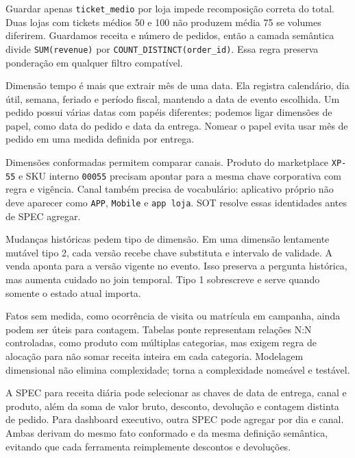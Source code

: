Guardar apenas \texttt{ticket\_medio} por loja impede recomposição correta do total. Duas lojas com tickets médios 50 e 100 não produzem média 75 se volumes diferirem. Guardamos receita e número de pedidos, então a camada semântica divide \texttt{SUM(revenue)} por \texttt{COUNT\_DISTINCT(order\_id)}. Essa regra preserva ponderação em qualquer filtro compatível.

Dimensão tempo é mais que extrair mês de uma data. Ela registra calendário, dia útil, semana, feriado e período fiscal, mantendo a data de evento escolhida. Um pedido possui várias datas com papéis diferentes; podemos ligar dimensões de papel, como data do pedido e data da entrega. Nomear o papel evita usar mês de pedido em uma medida definida por entrega.

Dimensões conformadas permitem comparar canais. Produto do marketplace \texttt{XP-55} e SKU interno \texttt{00055} precisam apontar para a mesma chave corporativa com regra e vigência. Canal também precisa de vocabulário: aplicativo próprio não deve aparecer como \texttt{APP}, \texttt{Mobile} e \texttt{app loja}. SOT resolve essas identidades antes de SPEC agregar.

Mudanças históricas pedem tipo de dimensão. Em uma dimensão lentamente mutável tipo 2, cada versão recebe chave substituta e intervalo de validade. A venda aponta para a versão vigente no evento. Isso preserva a pergunta histórica, mas aumenta cuidado no join temporal. Tipo 1 sobrescreve e serve quando somente o estado atual importa.

Fatos sem medida, como ocorrência de visita ou matrícula em campanha, ainda podem ser úteis para contagem. Tabelas ponte representam relações N:N controladas, como produto com múltiplas categorias, mas exigem regra de alocação para não somar receita inteira em cada categoria. Modelagem dimensional não elimina complexidade; torna a complexidade nomeável e testável.

A SPEC para receita diária pode selecionar as chaves de data de entrega, canal e produto, além da soma de valor bruto, desconto, devolução e contagem distinta de pedido. Para dashboard executivo, outra SPEC pode agregar por dia e canal. Ambas derivam do mesmo fato conformado e da mesma definição semântica, evitando que cada ferramenta reimplemente descontos e devoluções.

